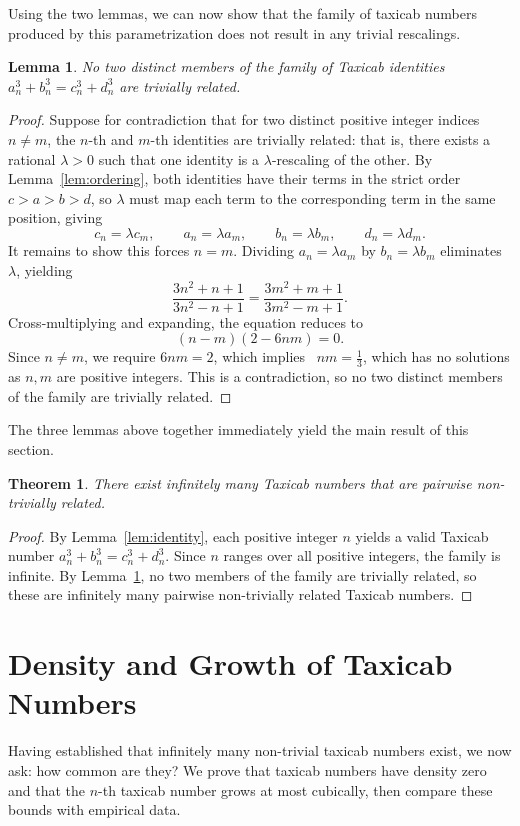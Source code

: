 \documentclass[12pt]{amsart}
\newtheorem{theorem}{Theorem}
\newtheorem{lemma}{Lemma}
\theoremstyle{definition}
\theoremstyle{remark}
\begin{document}
Using the two lemmas, we can now show that the family of taxicab numbers produced by this parametrization does not result in any trivial rescalings.

\begin{lemma}\label{lem:nontrivial}
  No two distinct members of the family of Taxicab identities 
  $a_n^3 + b_n^3 = c_n^3 + d_n^3$ are trivially related.
\end{lemma}

\begin{proof}
Suppose for contradiction that for two distinct positive integer indices 
$n \ne m$, the $n$-th and $m$-th identities are trivially related: that 
is, there exists a rational $\lambda > 0$ such that one identity is a 
$\lambda$-rescaling of the other. By Lemma~\ref{lem:ordering}, both 
identities have their terms in the strict order $c > a > b > d$, so 
$\lambda$ must map each term to the corresponding term in the same 
position, giving
\[
  c_n = \lambda c_m, \qquad a_n = \lambda a_m, \qquad 
  b_n = \lambda b_m, \qquad d_n = \lambda d_m.
\]
It remains to show this forces $n = m$. Dividing $a_n = \lambda a_m$ by 
$b_n = \lambda b_m$ eliminates $\lambda$, yielding
\[
  \frac{3n^2+n+1}{3n^2-n+1} = \frac{3m^2+m+1}{3m^2-m+1}.
\]
Cross-multiplying and expanding, the equation reduces to
\[
  (n-m)(2 - 6nm) = 0.
\]
Since $n \ne m$, we require $6nm = 2$, which implies \ $nm = \tfrac{1}{3}$, which 
has no solutions as $n,m$ are positive integers. This is a contradiction, so no two 
distinct members of the family are trivially related.
\end{proof}

The three lemmas above together immediately yield the main result of this 
section.

\begin{theorem}\label{thm:family}
  There exist infinitely many Taxicab numbers that are pairwise 
  non-trivially related.
\end{theorem}

\begin{proof}
By Lemma~\ref{lem:identity}, each positive integer $n$ yields a valid 
Taxicab number $a_n^3 + b_n^3 = c_n^3 + d_n^3$. Since $n$ ranges over 
all positive integers, the family is infinite. By 
Lemma~\ref{lem:nontrivial}, no two members of the family are trivially 
related, so these are infinitely many pairwise non-trivially related 
Taxicab numbers.
\end{proof}


\section{Density and Growth of Taxicab Numbers}\label{sec:density}
Having established that infinitely many non-trivial taxicab numbers exist, we now ask: how common are they? We prove that taxicab numbers have density zero and that the $n$-th taxicab number grows at most cubically, then compare these bounds with empirical data.
\newline
\end{document}

